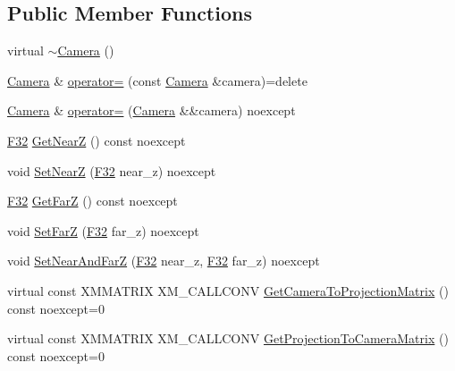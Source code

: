 \subsection*{Public Member Functions}
\begin{DoxyCompactItemize}
\item 
virtual \hyperlink{classmage_1_1rendering_1_1_camera_ae892311357bddc9ea081912579f8cd9c}{$\sim$\+Camera} ()
\item 
\hyperlink{classmage_1_1rendering_1_1_camera}{Camera} \& \hyperlink{classmage_1_1rendering_1_1_camera_a3aceb5277ca9ea66037de3d5ed44434a}{operator=} (const \hyperlink{classmage_1_1rendering_1_1_camera}{Camera} \&camera)=delete
\item 
\hyperlink{classmage_1_1rendering_1_1_camera}{Camera} \& \hyperlink{classmage_1_1rendering_1_1_camera_a61b594df300888d8d442855d18b871a3}{operator=} (\hyperlink{classmage_1_1rendering_1_1_camera}{Camera} \&\&camera) noexcept
\item 
\hyperlink{namespacemage_aa97e833b45f06d60a0a9c4fc22ae02c0}{F32} \hyperlink{classmage_1_1rendering_1_1_camera_a2c33ca20b544cf126b7984ee46f5b2c3}{Get\+NearZ} () const noexcept
\item 
void \hyperlink{classmage_1_1rendering_1_1_camera_af2c25869a422be0ba4224854a256ca21}{Set\+NearZ} (\hyperlink{namespacemage_aa97e833b45f06d60a0a9c4fc22ae02c0}{F32} near\+\_\+z) noexcept
\item 
\hyperlink{namespacemage_aa97e833b45f06d60a0a9c4fc22ae02c0}{F32} \hyperlink{classmage_1_1rendering_1_1_camera_a461777ca352f55ae2426bac8105fa2f7}{Get\+FarZ} () const noexcept
\item 
void \hyperlink{classmage_1_1rendering_1_1_camera_a1c0924d95ff4a1da571be49e05f31da2}{Set\+FarZ} (\hyperlink{namespacemage_aa97e833b45f06d60a0a9c4fc22ae02c0}{F32} far\+\_\+z) noexcept
\item 
void \hyperlink{classmage_1_1rendering_1_1_camera_a3301bdfa8d5408c79d5720193d91f8c6}{Set\+Near\+And\+FarZ} (\hyperlink{namespacemage_aa97e833b45f06d60a0a9c4fc22ae02c0}{F32} near\+\_\+z, \hyperlink{namespacemage_aa97e833b45f06d60a0a9c4fc22ae02c0}{F32} far\+\_\+z) noexcept
\item 
virtual const X\+M\+M\+A\+T\+R\+IX X\+M\+\_\+\+C\+A\+L\+L\+C\+O\+NV \hyperlink{classmage_1_1rendering_1_1_camera_a08481175c3718a24333b22176e240d44}{Get\+Camera\+To\+Projection\+Matrix} () const noexcept=0
\item 
virtual const X\+M\+M\+A\+T\+R\+IX X\+M\+\_\+\+C\+A\+L\+L\+C\+O\+NV \hyperlink{classmage_1_1rendering_1_1_camera_abb21116f8a6c7513804431d23fa4cf17}{Get\+Projection\+To\+Camera\+Matrix} () const noexcept=0

\end{DoxyCompactItemize}

